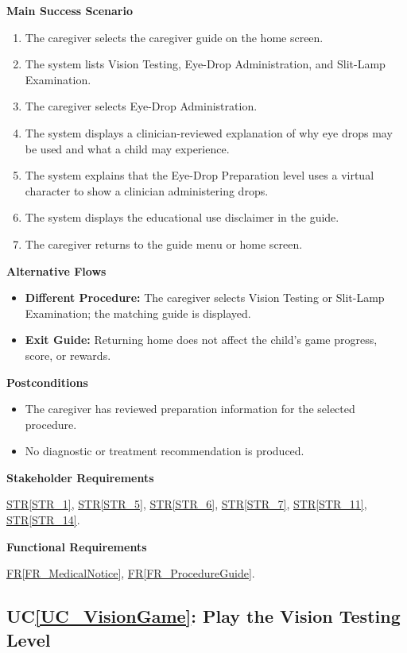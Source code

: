 \documentclass[10pt]{article}
\newcommand{\strref}[1]{\hyperref[#1]{STR\ref*{#1}}}
\newcounter{ucnum} %
\newcommand{\ucheading}[1]{UC\ref*{#1}}
\newcommand{\rref}[1]{\hyperref[#1]{FR\ref*{#1}}}
\begin{document}
\textbf{Main Success Scenario}
\begin{enumerate}
    \item The caregiver selects the caregiver guide on the home screen.
    \item The system lists Vision Testing, Eye-Drop Administration,
    and Slit-Lamp Examination.
    \item The caregiver selects Eye-Drop Administration.
    \item The system displays a clinician-reviewed explanation of why
    eye drops may be used and what a child may experience.
    \item The system explains that the Eye-Drop Preparation level uses
    a virtual character to show a clinician administering drops.
    \item The system displays the educational use disclaimer in the guide.
    \item The caregiver returns to the guide menu or home screen.
\end{enumerate}

\textbf{Alternative Flows}
\begin{itemize}
    \item \textbf{Different Procedure:} The caregiver selects Vision
    Testing or Slit-Lamp Examination; the matching guide is displayed.
    \item \textbf{Exit Guide:} Returning home does not affect the
    child's game progress, score, or rewards.
\end{itemize}

\textbf{Postconditions}
\begin{itemize}
    \item The caregiver has reviewed preparation information for
    the selected procedure.
    \item No diagnostic or treatment recommendation is produced.
\end{itemize}

\textbf{Stakeholder Requirements}

\strref{STR_1}, \strref{STR_5}, \strref{STR_6}, \strref{STR_7}, \strref{STR_11}, \strref{STR_14}.

\textbf{Functional Requirements}

\rref{FR_MedicalNotice}, \rref{FR_ProcedureGuide}.

\label{UC_VisionGame}
\subsection{\ucheading{UC_VisionGame}: Play the Vision Testing Level}
\end{document}
